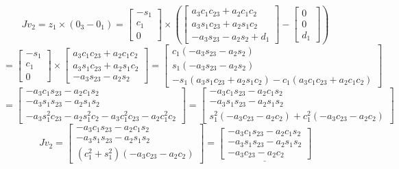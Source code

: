 \documentclass[12pt,norsk,a4paper]{article}
\begin{document}
    \[Jv_2 = z_1\times(0_3-0_1) = \left[\begin{array}{c}-s_1 \\ c_1 \\ 0\end{array}\right]\times\left(\left[\begin{array}{c}a_3c_1c_{23}+a_2c_1c_2 \\  a_3s_1c_{23}+a_2s_1c_2 \\ -a_3s_{23}-a_2s_2+d_1\end{array}\right]-\left[\begin{array}{c}0 \\ 0 \\ d_1\end{array}\right]\right) \]
    \[= \left[\begin{array}{c}-s_1 \\ c_1 \\ 0\end{array}\right]\times\left[\begin{array}{c}a_3c_1c_{23}+a_2c_1c_2 \\  a_3s_1c_{23}+a_2s_1c_2 \\ -a_3s_{23}-a_2s_2\end{array}\right] = \left[\begin{array}{c} c_1(-a_3s_{23}-a_2s_2) \\ s_1(-a_3s_{23}-a_2s_2) \\ -s_1( a_3s_1c_{23}+a_2s_1c_2)-c_1(a_3c_1c_{23}+a_2c_1c_2)\end{array}\right]\]
    \[= \left[\begin{array}{c} -a_3c_1s_{23}-a_2c_1s_2 \\ -a_3s_1s_{23}-a_2s_1s_2\\ -a_3s_1^2c_{23}-a_2s_1^2c_2-a_3c_1^2c_{23}-a_2c_1^2c_2\end{array}\right] = \left[\begin{array}{c} -a_3c_1s_{23}-a_2c_1s_2 \\ -a_3s_1s_{23}-a_2s_1s_2\\ s_1^2(-a_3c_{23}-a_2c_2)+c_1^2(-a_3c_{23}-a_2c_2)\end{array}\right]\]
    \[Jv_2= \left[\begin{array}{c} -a_3c_1s_{23}-a_2c_1s_2 \\ -a_3s_1s_{23}-a_2s_1s_2\\ (c_1^2+s_1^2)(-a_3c_{23}-a_2c_2)\end{array}\right] = \underline{\left[\begin{array}{c} -a_3c_1s_{23}-a_2c_1s_2 \\ -a_3s_1s_{23}-a_2s_1s_2\\ -a_3c_{23}-a_2c_2\end{array}\right]}\]
\end{document}
